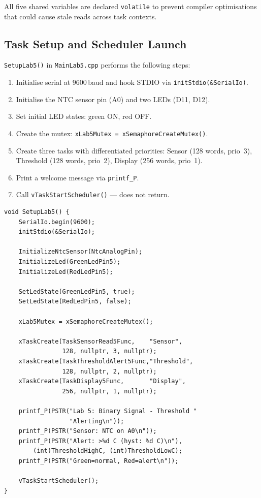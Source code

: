 \documentclass[12pt]{article}
\begin{document}
All five shared variables are declared \texttt{volatile} to prevent compiler optimisations that could cause stale reads across task contexts.

\subsection{Task Setup and Scheduler Launch}

\texttt{SetupLab5()} in \texttt{MainLab5.cpp} performs the following steps:
\begin{enumerate}
  \item Initialise serial at 9600\,baud and hook STDIO via \texttt{initStdio(\&SerialIo)}.
  \item Initialise the NTC sensor pin (A0) and two LEDs (D11, D12).
  \item Set initial LED states: green ON, red OFF.
  \item Create the mutex: \texttt{xLab5Mutex = xSemaphoreCreateMutex()}.
  \item Create three tasks with differentiated priorities: Sensor (128 words, prio~3), Threshold (128 words, prio~2), Display (256 words, prio~1).
  \item Print a welcome message via \texttt{printf\_P}.
  \item Call \texttt{vTaskStartScheduler()} --- does not return.
\end{enumerate}

\begin{lstlisting}[caption={SetupLab5 --- task creation and scheduler launch}]
void SetupLab5() {
    SerialIo.begin(9600);
    initStdio(&SerialIo);

    InitializeNtcSensor(NtcAnalogPin);
    InitializeLed(GreenLedPin5);
    InitializeLed(RedLedPin5);

    SetLedState(GreenLedPin5, true);
    SetLedState(RedLedPin5, false);

    xLab5Mutex = xSemaphoreCreateMutex();

    xTaskCreate(TaskSensorRead5Func,    "Sensor",
                128, nullptr, 3, nullptr);
    xTaskCreate(TaskThresholdAlert5Func,"Threshold",
                128, nullptr, 2, nullptr);
    xTaskCreate(TaskDisplay5Func,       "Display",
                256, nullptr, 1, nullptr);

    printf_P(PSTR("Lab 5: Binary Signal - Threshold "
                  "Alerting\n"));
    printf_P(PSTR("Sensor: NTC on A0\n"));
    printf_P(PSTR("Alert: >%d C (hyst: %d C)\n"),
        (int)ThresholdHighC, (int)ThresholdLowC);
    printf_P(PSTR("Green=normal, Red=alert\n"));

    vTaskStartScheduler();
}
\end{lstlisting}
\end{document}
